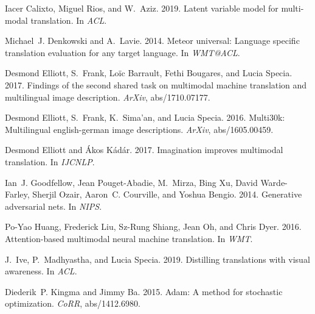 \documentclass[11pt]{article}
\begin{document}
\begin{thebibliography}{36}
Iacer Calixto, Miguel Rios, and W.~Aziz. 2019.
\newblock Latent variable model for multi-modal translation.
\newblock In \emph{ACL}.

Michael~J. Denkowski and A.~Lavie. 2014.
\newblock Meteor universal: Language specific translation evaluation for any
  target language.
\newblock In \emph{WMT@ACL}.

Desmond Elliott, S.~Frank, Lo{\"i}c Barrault, Fethi Bougares, and Lucia Specia.
  2017.
\newblock Findings of the second shared task on multimodal machine translation
  and multilingual image description.
\newblock \emph{ArXiv}, abs/1710.07177.

Desmond Elliott, S.~Frank, K.~Sima'an, and Lucia Specia. 2016.
\newblock Multi30k: Multilingual english-german image descriptions.
\newblock \emph{ArXiv}, abs/1605.00459.

Desmond Elliott and {\'A}kos K{\'a}d{\'a}r. 2017.
\newblock Imagination improves multimodal translation.
\newblock In \emph{IJCNLP}.

Ian~J. Goodfellow, Jean Pouget-Abadie, M.~Mirza, Bing Xu, David Warde-Farley,
  Sherjil Ozair, Aaron~C. Courville, and Yoshua Bengio. 2014.
\newblock Generative adversarial nets.
\newblock In \emph{NIPS}.

Po-Yao Huang, Frederick Liu, Sz-Rung Shiang, Jean Oh, and Chris Dyer. 2016.
\newblock Attention-based multimodal neural machine translation.
\newblock In \emph{WMT}.

J.~Ive, P.~Madhyastha, and Lucia Specia. 2019.
\newblock Distilling translations with visual awareness.
\newblock In \emph{ACL}.

Diederik~P. Kingma and Jimmy Ba. 2015.
\newblock Adam: A method for stochastic optimization.
\newblock \emph{CoRR}, abs/1412.6980.


\end{thebibliography}
\end{document}
